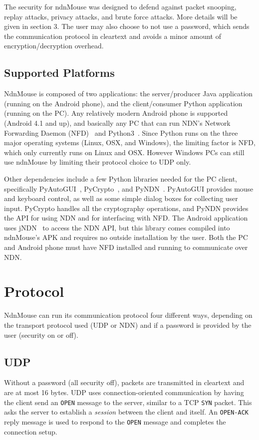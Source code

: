 \documentclass{sig-alternate}
\renewcommand\_{\textunderscore\allowbreak}  %
\begin{document}
The security for ndnMouse was designed to defend against packet snooping, replay attacks, privacy attacks, and brute force attacks. More details will be given in section 3. The user may also choose to not use a password, which sends the communication protocol in cleartext and avoids a minor amount of encryption/decryption overhead. 

\subsection{Supported Platforms}
NdnMouse is composed of two applications: the server/producer Java application (running on the Android phone), and the client/consumer Python application (running on the PC). Any relatively modern Android phone is supported (Android 4.1 and up), and basically any PC that can run NDN's Network Forwarding Daemon (NFD)~\cite{nfd} and Python3~\cite{python3}. Since Python runs on the three major operating systems (Linux, OSX, and Windows), the limiting factor is NFD, which only currently runs on Linux and OSX. However Windows PCs can still use ndnMouse by limiting their protocol choice to UDP only.

Other dependencies include a few Python libraries needed for the PC client, specifically PyAutoGUI~\cite{pyautogui}, PyCrypto~\cite{pycrypto}, and PyNDN~\cite{pyndn}. PyAutoGUI provides mouse and keyboard control, as well as some simple dialog boxes for collecting user input. PyCrypto handles all the cryptography operations, and PyNDN provides the API for using NDN and for interfacing with NFD. The Android application uses jNDN~\cite{jndn} to access the NDN API, but this library comes compiled into ndnMouse's APK and requires no outside installation by the user. Both the PC and Android phone must have NFD installed and running to communicate over NDN.

\section{Protocol}
NdnMouse can run its communication protocol four different ways, depending on the transport protocol used (UDP or NDN) and if a password is provided by the user (security on or off).

\subsection{UDP}
Without a password (all security off), packets are transmitted in cleartext and are at most 16 bytes. UDP uses connection-oriented communication by having the client send an \texttt{OPEN} message to the server, similar to a TCP \texttt{SYN} packet. This asks the server to establish a \textit{session} between the client and itself. An \texttt{OPEN-ACK} reply message is used to respond to the \texttt{OPEN} message and completes the connection setup.
\end{document}
